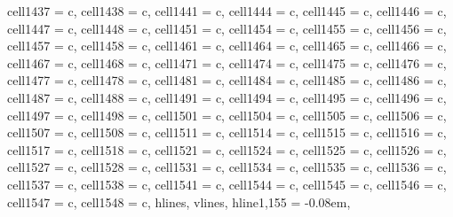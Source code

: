 \begin{longtblr}[
  label = none,
  entry = none,
]
{  cell{143}{7} = {c},
  cell{143}{8} = {c},
  cell{144}{1} = {c},
  cell{144}{4} = {c},
  cell{144}{5} = {c},
  cell{144}{6} = {c},
  cell{144}{7} = {c},
  cell{144}{8} = {c},
  cell{145}{1} = {c},
  cell{145}{4} = {c},
  cell{145}{5} = {c},
  cell{145}{6} = {c},
  cell{145}{7} = {c},
  cell{145}{8} = {c},
  cell{146}{1} = {c},
  cell{146}{4} = {c},
  cell{146}{5} = {c},
  cell{146}{6} = {c},
  cell{146}{7} = {c},
  cell{146}{8} = {c},
  cell{147}{1} = {c},
  cell{147}{4} = {c},
  cell{147}{5} = {c},
  cell{147}{6} = {c},
  cell{147}{7} = {c},
  cell{147}{8} = {c},
  cell{148}{1} = {c},
  cell{148}{4} = {c},
  cell{148}{5} = {c},
  cell{148}{6} = {c},
  cell{148}{7} = {c},
  cell{148}{8} = {c},
  cell{149}{1} = {c},
  cell{149}{4} = {c},
  cell{149}{5} = {c},
  cell{149}{6} = {c},
  cell{149}{7} = {c},
  cell{149}{8} = {c},
  cell{150}{1} = {c},
  cell{150}{4} = {c},
  cell{150}{5} = {c},
  cell{150}{6} = {c},
  cell{150}{7} = {c},
  cell{150}{8} = {c},
  cell{151}{1} = {c},
  cell{151}{4} = {c},
  cell{151}{5} = {c},
  cell{151}{6} = {c},
  cell{151}{7} = {c},
  cell{151}{8} = {c},
  cell{152}{1} = {c},
  cell{152}{4} = {c},
  cell{152}{5} = {c},
  cell{152}{6} = {c},
  cell{152}{7} = {c},
  cell{152}{8} = {c},
  cell{153}{1} = {c},
  cell{153}{4} = {c},
  cell{153}{5} = {c},
  cell{153}{6} = {c},
  cell{153}{7} = {c},
  cell{153}{8} = {c},
  cell{154}{1} = {c},
  cell{154}{4} = {c},
  cell{154}{5} = {c},
  cell{154}{6} = {c},
  cell{154}{7} = {c},
  cell{154}{8} = {c},
  hlines,
  vlines,
  hline{1,155} = {-}{0.08em},
}


\end{longtblr}
